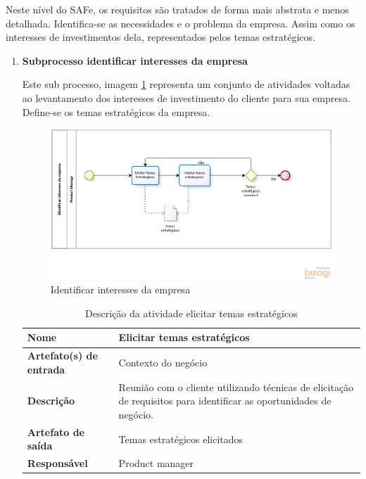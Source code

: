 Neste nível do SAFe, os requisitos são tratados de forma mais abstrata e menos detalhada. Identifica-se as necessidades e o problema da empresa. Assim como os interesses de investimentos dela, representados pelos temas estratégicos.
\begin{enumerate}
\item \textbf{Subprocesso identificar interesses da empresa}

Este sub processo, imagem \ref{processoInteresses} representa um conjunto de atividades voltadas ao levantamento dos interesses de investimento do cliente para sua empresa. Define-se os temas estratégicos da empresa.

\begin{figure}[H]
    \centering
    \caption{Identificar interesses da empresa}
    \label{processoInteresses}
    \includegraphics[keepaspectratio=true,scale=0.6]{figuras/processoInteresses.eps}
\end{figure}

\begin{table}[H]
    \centering
    \label{descricaoAtividades1}
    \caption{Descrição da atividade elicitar temas estratégicos}
        \begin{tabular}{|l|p{10cm}|}
        \hline
        \textbf{Nome} & Elicitar temas estratégicos \\
        \hline
        \textbf{Artefato(s) de entrada} & Contexto do negócio \\
        \hline
        \textbf{Descrição} & Reunião com o cliente utilizando técnicas de elicitação de requisitos para identificar as oportunidades de negócio. \\
        \hline
        \textbf{Artefato de saída} & Temas estratégicos elicitados \\
        \hline
        \textbf{Responsável} & Product manager\\
        \hline
    \end{tabular}
\end{table}


\end{enumerate}
